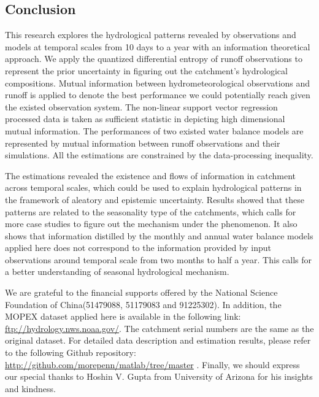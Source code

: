 \documentclass[draft,wrr]{AGUTeX}
\begin{document}
\begin{article}
\section{Conclusion}
This research explores the hydrological patterns revealed by observations and models at temporal scales from 10 days to a year with an information theoretical approach. We apply the quantized differential entropy of runoff observations to represent the prior uncertainty in figuring out the catchment's hydrological compositions. Mutual information between hydrometeorological observations and runoff is applied to denote the best performance we could potentially reach given the existed observation system. The non-linear support vector regression processed data is taken as sufficient statistic in depicting  high dimensional mutual information.
The performances of two existed water balance models are represented by mutual information between runoff observations and their simulations. All the estimations are constrained by the  data-processing inequality. 

The estimations revealed the existence and flows of information in catchment across temporal scales, which could be used to explain hydrological patterns in the framework of aleatory and epistemic uncertainty. Results showed that these patterns are related to the seasonality type of the catchments, which calls for more case studies to figure out the mechanism under the phenomenon. It also shows that information distilled by the monthly and annual water balance models applied here does not correspond to the information provided by input observations around temporal scale from two months to half a year. This calls for a better understanding of seasonal hydrological mechanism.   

\begin{acknowledgments}
We are grateful to the financial supports offered by the National Science Foundation of China(51479088, 51179083 and 91225302). In addition, the MOPEX dataset applied here is available in the following link: \underline{ftp://hydrology.nws.noaa.gov/}. The catchment serial numbers are the same as the original dataset. For detailed data description and estimation results, please refer to the following Github repository: \underline{http://github.com/morepenn/matlab/tree/master} . Finally, we should express our special thanks to Hoshin V. Gupta from University of Arizona for his insights and kindness. 
\end{acknowledgments}




\end{article}
\end{document}
